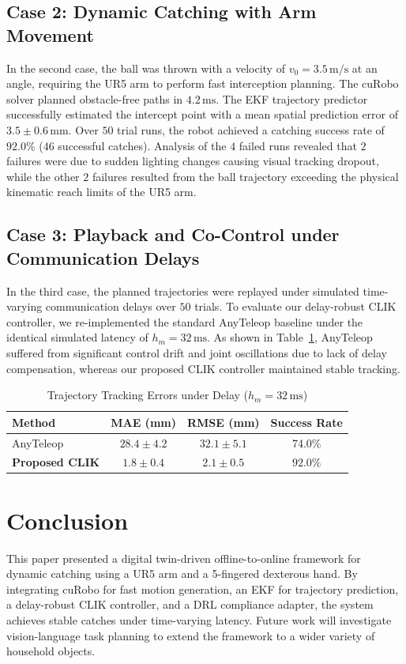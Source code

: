 \documentclass[letterpaper,journal]{IEEEtran}
\begin{document}
\subsection{Case 2: Dynamic Catching with Arm Movement}
In the second case, the ball was thrown with a velocity of $v_0 = 3.5\,\text{m/s}$ at an angle, requiring the UR5 arm to perform fast interception planning. The cuRobo solver planned obstacle-free paths in $4.2\,\text{ms}$. The EKF trajectory predictor successfully estimated the intercept point with a mean spatial prediction error of $3.5 \pm 0.6\,\text{mm}$. Over $50$ trial runs, the robot achieved a catching success rate of $92.0\%$ ($46$ successful catches). Analysis of the $4$ failed runs revealed that $2$ failures were due to sudden lighting changes causing visual tracking dropout, while the other $2$ failures resulted from the ball trajectory exceeding the physical kinematic reach limits of the UR5 arm.

\subsection{Case 3: Playback and Co-Control under Communication Delays}
In the third case, the planned trajectories were replayed under simulated time-varying communication delays over $50$ trials. To evaluate our delay-robust CLIK controller, we re-implemented the standard AnyTeleop \cite{anyteleop} baseline under the identical simulated latency of $h_m = 32\,\text{ms}$. As shown in Table~\ref{tab:tracking_errors}, AnyTeleop suffered from significant control drift and joint oscillations due to lack of delay compensation, whereas our proposed CLIK controller maintained stable tracking.

\begin{table}[h]
\centering
\caption{Trajectory Tracking Errors under Delay ($h_m = 32\,\text{ms}$)}
\label{tab:tracking_errors}
\begin{tabular}{|l|c|c|c|}
\hline
\textbf{Method} & \textbf{MAE (mm)} & \textbf{RMSE (mm)} & \textbf{Success Rate} \\ \hline
AnyTeleop \cite{anyteleop} & $28.4 \pm 4.2$ & $32.1 \pm 5.1$ & 74.0\% \\ \hline
\textbf{Proposed CLIK} & $\mathbf{1.8 \pm 0.4}$ & $\mathbf{2.1 \pm 0.5}$ & $\mathbf{92.0\%}$ \\ \hline
\end{tabular}
\end{table}

\section{Conclusion}
This paper presented a digital twin-driven offline-to-online framework for dynamic catching using a UR5 arm and a 5-fingered dexterous hand. By integrating cuRobo for fast motion generation, an EKF for trajectory prediction, a delay-robust CLIK controller, and a DRL compliance adapter, the system achieves stable catches under time-varying latency. Future work will investigate vision-language task planning to extend the framework to a wider variety of household objects.
\end{document}
